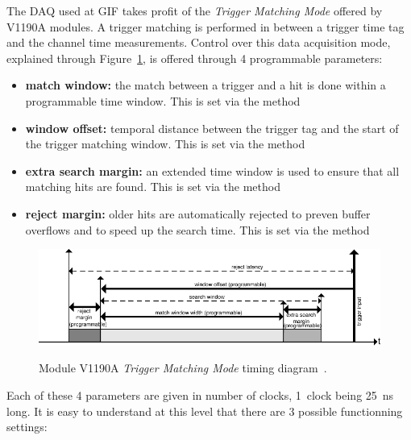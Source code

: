 	The DAQ used at GIF takes profit of the \textit{Trigger Matching Mode} offered by V1190A modules. A trigger matching is performed in between a trigger time tag and the channel time measurements. Control over this data acquisition mode, explained through Figure~\ref{fig:V1190A-TMM}, is offered through 4 programmable parameters:
        
	\begin{itemize}
		\item \textbf{match window:} the match between a trigger and a hit is done within a programmable time window. This is set via the method\\ 
		\item \textbf{window offset:} temporal distance between the trigger tag and the start of the trigger matching window. This is set via the method\\ 
		\item \textbf{extra search margin:} an extended time window is used to ensure that all matching hits are found. This is set via the method\\ 
		\item \textbf{reject margin:} older hits are automatically rejected to preven buffer overflows and to speed up the search time. This is set via the method\\ 
	\end{itemize}
    
    \begin{figure}[H]
		\centering
		\includegraphics[width = 1.25\plotwidth]{fig/app1/V1190A-TMM.pdf}\\
		\caption{\label{fig:V1190A-TMM} Module V1190A \textit{Trigger Matching Mode} timing diagram~\cite{V1190AMUT}.}
	\end{figure}
	
	Each of these 4 parameters are given in number of clocks, \SI{1}{clock} being \SI{25}{ns} long. It is easy to understand at this level that there are 3 possible functionning settings:
        
